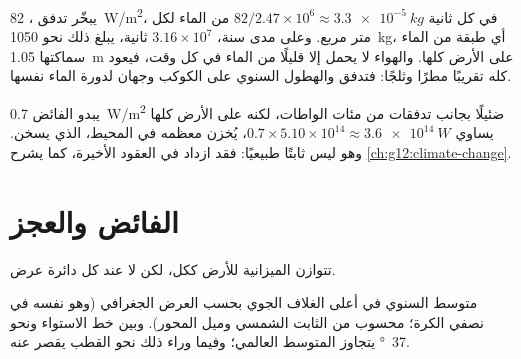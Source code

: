 \begin{example}\label{ex:g10:earth-energy-budget:evaporation}
يبخّر تدفق ، \qty{82}{W/m^2}، في كل ثانية $82/2.47\times
10^6 \approx \qty{3.3e-5}{kg}$ من الماء لكل متر مربع. وعلى مدى سنة،
$3.16\times10^7$ ثانية، يبلغ ذلك نحو \qty{1050}{kg}، أي طبقة من الماء سماكتها
\qty{1.05}{m} على الأرض كلها. والهواء لا يحمل إلا قليلًا من الماء في كل وقت،
فيعود كله تقريبًا مطرًا وثلجًا: فتدفق  والهطول السنوي على الكوكب
وجهان لدورة الماء
نفسها.
\end{example}

\begin{remark}\label{rem:g10:earth-energy-budget:imbalance}
يبدو الفائض \qty{0.7}{W/m^2} ضئيلًا بجانب تدفقات من مئات الواطات، لكنه على الأرض
كلها يساوي $0.7 \times 5.10\times10^{14} \approx
\qty{3.6e14}{W}$، يُخزن معظمه في المحيط، الذي يسخن. وهو ليس ثابتًا طبيعيًا: فقد
ازداد في العقود الأخيرة، كما يشرح
\cref{ch:g12:climate-change}.
\end{remark}

\section{الفائض والعجز}

تتوازن الميزانية للأرض ككل، لكن لا عند كل دائرة عرض.

\begin{omfigure}

{\small متوسط  السنوي في أعلى الغلاف الجوي بحسب العرض الجغرافي (وهو نفسه في
نصفي الكرة؛ محسوب من الثابت الشمسي وميل المحور). وبين خط الاستواء ونحو
\qty{37}{\degree} يتجاوز المتوسط العالمي؛ وفيما وراء ذلك نحو القطب يقصر
عنه.}
\end{omfigure}

